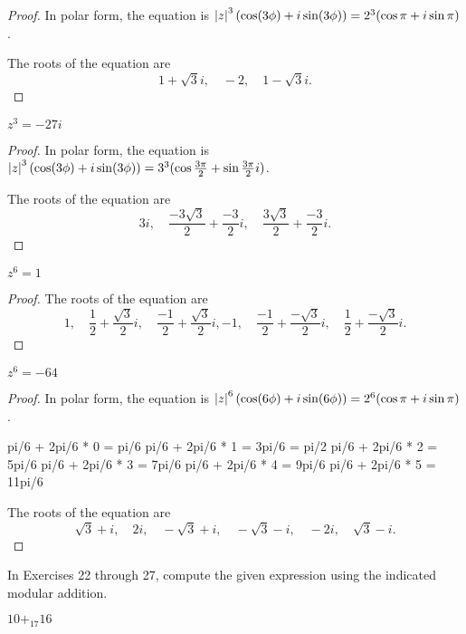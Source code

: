 \begin{proof}
    In polar form, the equation is $\left\vert{z}\right\vert^{3}(\cos (3\phi) + i\sin (3\phi)) = 2^{3}(\cos\pi + i\sin\pi)$.

    The roots of the equation are
    \[
        1 + \sqrt{3}i,\quad -2,\quad 1 - \sqrt{3}i.
    \]
\end{proof}

\begin{exercise}
    $z^{3} = -27i$
\end{exercise}

\begin{proof}
    In polar form, the equation is $\left\vert{z}\right\vert^{3}(\cos (3\phi) + i\sin (3\phi)) = 3^{3}(\cos\frac{3\pi}{2} + \sin\frac{3\pi}{2}i)$.

    The roots of the equation are
    \[
        3i,\quad \frac{-3\sqrt{3}}{2} + \frac{-3}{2}i,\quad\frac{3\sqrt{3}}{2} + \frac{-3}{2}i.
    \]
\end{proof}

\begin{exercise}
    $z^{6} = 1$
\end{exercise}

\begin{proof}
    The roots of the equation are
    \[
        1,\quad \frac{1}{2} + \frac{\sqrt{3}}{2}i,\quad \frac{-1}{2} + \frac{\sqrt{3}}{2}i, -1,\quad \frac{-1}{2} + \frac{-\sqrt{3}}{2}i,\quad \frac{1}{2} + \frac{-\sqrt{3}}{2}i.
    \]
\end{proof}

\begin{exercise}
    $z^{6} = -64$
\end{exercise}

\begin{proof}
    In polar form, the equation is $\left\vert{z}\right\vert^{6}(\cos(6\phi) + i\sin(6\phi)) = 2^{6}(\cos\pi + i\sin\pi)$.

    pi/6 + 2pi/6 * 0 = pi/6
    pi/6 + 2pi/6 * 1 = 3pi/6 = pi/2
    pi/6 + 2pi/6 * 2 = 5pi/6
    pi/6 + 2pi/6 * 3 = 7pi/6
    pi/6 + 2pi/6 * 4 = 9pi/6
    pi/6 + 2pi/6 * 5 = 11pi/6

    The roots of the equation are
    \[
        \sqrt{3} + i,\quad 2i,\quad -\sqrt{3} + i,\quad -\sqrt{3} - i,\quad -2i,\quad \sqrt{3} - i.
    \]
\end{proof}

In Exercises 22 through 27, compute the given expression using the indicated modular addition.

\begin{exercise}
    $10 {+}_{17} 16$
\end{exercise}

